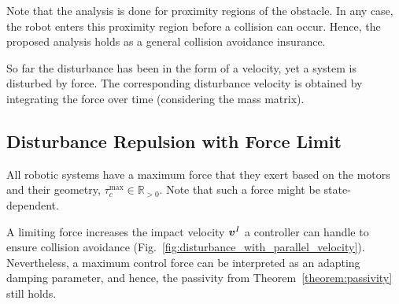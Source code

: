 Note that the analysis is done for proximity regions of the obstacle. In any case, the robot enters this proximity region before a collision can occur. Hence, the proposed analysis holds as a general collision avoidance insurance.

So far the disturbance has been in the form of a velocity, yet a system is disturbed by force. The corresponding disturbance velocity is obtained by integrating the force over time (considering the mass matrix). 

\subsection{Disturbance Repulsion with Force Limit}
All robotic systems have a maximum force that they  exert based on the motors and their geometry, $\tau_c^{\mathrm{max}} \in \mathbb{R}_{>0}$. Note that such a force might be state-dependent.

A limiting force increases the impact velocity $\boldsymbol{v}^I$ a controller can handle to ensure collision avoidance (Fig.~\ref{fig:disturbance_with_parallel_velocity}). Nevertheless, a maximum control force can be interpreted as an adapting damping parameter, and hence, the passivity from Theorem~\ref{theorem:passivity} still holds.


